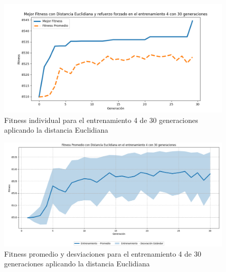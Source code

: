\documentclass[conference]{IEEEtran}
\begin{document}
\begin{figure}[H]
    \centering
    \includegraphics[width=0.9 \linewidth]{Euclidiana/Fitness_individual_30/Fitness_4_Eucli_30Gen.png}
    \caption{Fitness individual para el entrenamiento 4 de 30 generaciones aplicando la distancia Euclidiana}
    \label{fig:eucli_4_30}
\end{figure}
\begin{figure}[H]
    \centering
    \includegraphics[width=0.9 \linewidth]{Euclidiana/Fitness_individual_30/Fitness_4_Eucli_30Gen_Sombra.png}
    \caption{Fitness promedio y desviaciones para el entrenamiento 4 de 30 generaciones aplicando la distancia Euclidiana}
    \label{fig:eucli_4_30_sombra}
\end{figure}

\end{document}
